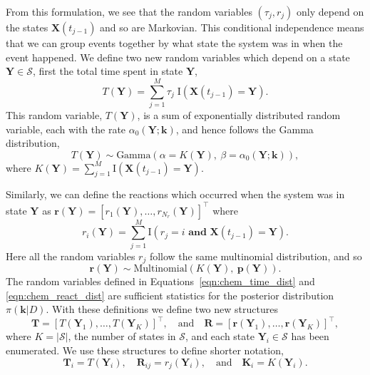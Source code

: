 \documentclass[final]{siamltex}
\begin{document}
From this formulation, we see that the random variables $(\tau_j, r_j)$ only depend on the states $\mathbf{X}(t_{j-1})$ and so are Markovian. This conditional independence means that we can group events together by what state the system was in when the event happened. We define two new random variables which depend on a state $\mathbf{Y} \in \mathcal{S}$, first the total time spent in state $\mathbf{Y}$,
\[
	T(\mathbf{Y}) = \sum\limits_{j=1}^M \tau_j\; \text{I}(\mathbf{X}(t_{j-1}) = \mathbf{Y}).
\]
This random variable, $T(\mathbf{Y})$, is a sum of exponentially
distributed random variable, each with the rate $\alpha_0(\mathbf{Y};\mathbf{k})$, and hence follows the Gamma distribution,
\begin{equation}\label{eqn:chem_time_dist}
	T(\mathbf{Y}) \sim \text{Gamma}\left(\alpha=K(\mathbf{Y}),~\beta = \alpha_0(\mathbf{Y}; \mathbf{k})\right),
\end{equation}
where $K(\mathbf{Y}) = \sum\limits_{j=1}^M \text{I}(\mathbf{X}(t_{j-1}) = \mathbf{Y})$.

Similarly, we can define the reactions which occurred when the system was in state $\mathbf{Y}$ as $\mathbf{r}(\mathbf{Y}) = [r_1(\mathbf{Y}), \ldots, r_{N_r}(\mathbf{Y})]^\top$ where
\[
	r_i(\mathbf{Y}) = \sum\limits_{j=1}^M \text{I}(r_j = i \textbf{ and }\mathbf{X}(t_{j-1}) = \mathbf{Y}).
\]
Here all the random variables $r_j$ follow the same multinomial distribution, and so
\begin{equation}\label{eqn:chem_react_dist}
	\mathbf{r}(\mathbf{Y}) \sim \text{Multinomial}(K(\mathbf{Y}),~\mathbf{p}(\mathbf{Y})). 
\end{equation}
The random variables defined in Equations~\eqref{eqn:chem_time_dist} and \eqref{eqn:chem_react_dist} are sufficient statistics for the posterior distribution $\pi(\mathbf{k}|D)$. With these definitions we define two new structures
\[
	\mathbf{T} = [T(\mathbf{Y}_1), \dots, T(\mathbf{Y}_K)]^\top, \quad \text{and} \quad \mathbf{R} = [\mathbf{r}(\mathbf{Y}_1), \dots, \mathbf{r}(\mathbf{Y}_K)]^\top,
\]
where $K = |\mathcal{S}|$, the number of states in $\mathcal{S}$, and each state $\mathbf{Y}_i \in \mathcal{S}$ has been enumerated. We use these structures to define shorter notation,
\[
	\mathbf{T}_i = T(\mathbf{Y}_i), \quad \mathbf{R}_{ij} = r_j(\mathbf{Y}_i), \quad \text{and} \quad \mathbf{K}_i = K(\mathbf{Y}_i).
\]
\end{document}
